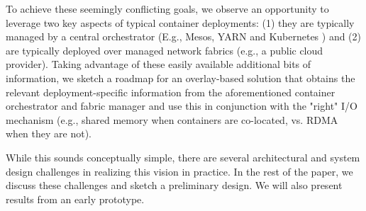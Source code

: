 To achieve these seemingly conflicting goals, we observe an opportunity to
leverage two key aspects of typical container deployments: (1) they are
typically managed by a central orchestrator (E.g., Mesos, YARN and Kubernetes
\cite{mesos,yarn,kubernetes}) and (2) are typically deployed over managed network
fabrics (e.g., a public cloud provider). Taking advantage of these easily
available additional bits of information, we sketch a roadmap for an
overlay-based solution that obtains the relevant deployment-specific
information from the aforementioned container orchestrator and fabric manager
and use this in conjunction with the "right" I/O mechanism (e.g., shared memory
when containers are co-located, vs. RDMA when they are not). 

While this sounds conceptually simple, there are several architectural
and system design challenges in realizing this vision in practice. In the rest
of the paper, we discuss these challenges and sketch a preliminary design. We
will also present results from an early prototype.
